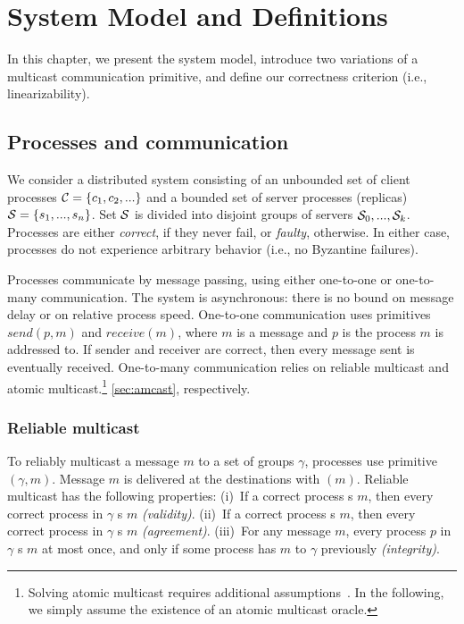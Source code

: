 \chapter[System Model and Definitions]{System Model and Definitions}
\label{sec:sysmodel}

In this chapter, we present the system model, introduce two variations of a
multicast communication primitive, and define our correctness criterion (i.e.,
linearizability).

\section{Processes and communication}

We consider a distributed system consisting of an unbounded set of client
processes $\mathcal{C} = \{c_1, c_2, ...\}$ and a bounded set of server processes
(replicas) $\mathcal{S} = \{s_1, ..., s_n\}$.  Set $\mathcal{S}$ is divided into disjoint
groups of servers $\mathcal{S}_0, ..., \mathcal{S}_k$. Processes are either \emph{correct}, if
they never fail, or \emph{faulty}, otherwise.  In either case, processes do not
experience arbitrary behavior (i.e., no Byzantine failures).

Processes communicate by message passing, using either one-to-one or one-to-many
communication.  The system is asynchronous: there is no bound on message delay
or on relative process speed.  One-to-one communication uses primitives
$send(p,m)$ and $receive(m)$, where $m$ is a message and $p$ is the process $m$
is addressed to.  If sender and receiver are correct, then every message sent is
eventually received. One-to-many communication relies on reliable multicast and
atomic multicast.\footnote{Solving atomic multicast requires additional
assumptions~\cite{CT96,FLP85}. In the following, we simply assume the existence
of an atomic multicast oracle.} %
\ref{sec:amcast}, respectively.


\subsection{Reliable multicast} \label{sec:rmcast}

To reliably multicast a message $m$ to a set of groups $\gamma$, processes use
primitive \rmcast$(\gamma, m)$.  Message $m$ is delivered at the destinations
with \rmdel$(m)$.  Reliable multicast has the following properties: (i)~If a
correct process \rmcast{}s $m$, then every correct process in $\gamma$ \rmdel{}s
$m$ \emph{(validity)}. (ii)~If a correct process \rmdel{}s $m$, then every
correct process in $\gamma$ \rmdel{}s $m$ \emph{(agreement)}. (iii)~For any
message $m$, every process $p$ in $\gamma$ \rmdel{}s $m$ at most once, and only
if some process has \rmcast{} $m$ to $\gamma$ previously \emph{(integrity)}.

